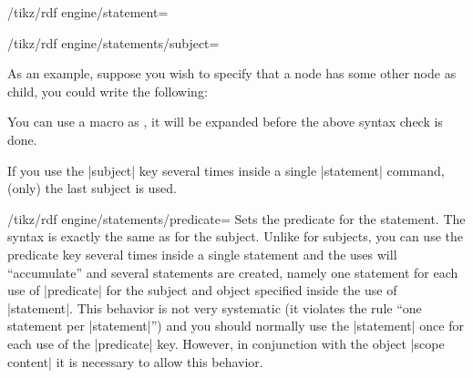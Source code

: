 \begin{key}{/tikz/rdf engine/statement=}
\begin{key}{/tikz/rdf engine/statements/subject=}
\begin{enumerate}
                As an example, suppose you wish to specify that a node has some
                other node as child, you could write the following:
\begin{codeexample}
\end{codeexample}
        \end{enumerate}
        You can use a macro as , it will be expanded before the
        above syntax check is done.

        If you use the |subject| key several times inside a single |statement|
        command, (only) the last subject is used.
    \end{key}

    \begin{key}{/tikz/rdf engine/statements/predicate=}
        Sets the predicate for the statement. The syntax is exactly the same as
        for the subject. Unlike for subjects, you can use the predicate key
        several times inside a single statement and the uses will
        ``accumulate'' and several statements are created, namely one statement
        for each use of |predicate| for the subject and object specified inside
        the use of |statement|. This behavior is not very systematic (it
        violates the rule ``one statement per |statement|'') and you should
        normally use the  |statement| once for each use  of the |predicate|
        key. However, in conjunction with the object |scope content| it is
        necessary to allow this behavior.
  \end{key}


\end{key}
